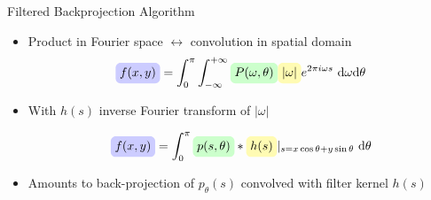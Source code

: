 \begin{frame}[t]{Filtered Backprojection Algorithm}

	\begin{itemize}
		\setlength\itemsep{0.5cm}

		\item Product in Fourier space $\leftrightarrow$ convolution in spatial domain
		      \begin{equation}
			      \label{eqn:ct_analytic_4}
			      \tikz[baseline]{\node[fill=blue!20,anchor=base, rounded corners] (f2) {$f(x,y)$};}%
			      = \int_0^\pi \int_{-\infty}^{+\infty}
			      \tikz[baseline]{\node[fill=green!20,anchor=base, rounded corners] (f2) {${P(\omega, \theta)}$};}%
			      \tikz[baseline]{\node[fill=yellow!30,anchor=base, rounded corners] (f2) {$|\omega|$};}%
			      e^{2 \pi i \omega s} \ \textnormal d\omega \textnormal d\theta
		      \end{equation}
		\item With $h(s)$ inverse Fourier transform of $|\omega|$

		      \begin{equation}
			      \label{eqn:ct_analytic_5}
			      \tikz[baseline]{\node[fill=blue!20,anchor=base, rounded corners] (f2) {$f(x,y)$};}%
			      = \int_{0}^\pi
			      \tikz[baseline]{\node[fill=green!20,anchor=base, rounded corners] (f2) {${p(s, \theta)}$};}%
			      *
			      \tikz[baseline]{\node[fill=yellow!30,anchor=base, rounded corners] (f2) {$h(s)$};}%
			      |_{s=x \cos \theta + y \sin \theta} \ \textnormal d\theta
		      \end{equation}

		\item Amounts to back-projection of $p_\theta(s)$ convolved with filter kernel $h(s)$

	\end{itemize}
\end{frame}

